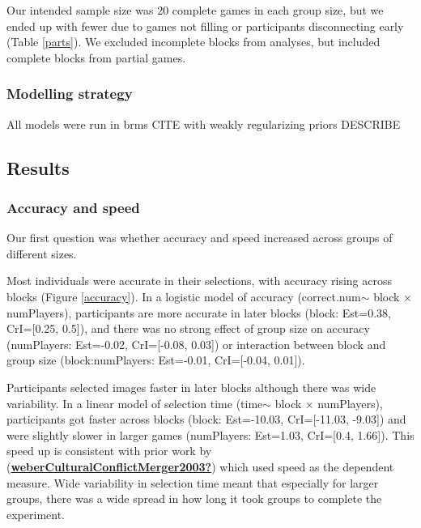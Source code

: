\documentclass[
  english,
  a4paper,
]{article}
\begin{document}
Our intended sample size was 20 complete games in each group size, but we ended up with fewer due to games not filling or participants disconnecting early (Table \ref{parts}). We excluded incomplete blocks from analyses, but included complete blocks from partial games.

\hypertarget{modelling-strategy}{%
\subsubsection{Modelling strategy}\label{modelling-strategy}}

All models were run in brms CITE with weakly regularizing priors DESCRIBE

\hypertarget{results}{%
\subsection{Results}\label{results}}

\hypertarget{accuracy-and-speed}{%
\subsubsection{Accuracy and speed}\label{accuracy-and-speed}}

Our first question was whether accuracy and speed increased across groups of different sizes.

Most individuals were accurate in their selections, with accuracy rising across blocks (Figure \ref{accuracy}). In a logistic model of accuracy (correct.num\(\sim\) block \(\times\) numPlayers), participants are more accurate in later blocks (block: Est=0.38, CrI={[}0.25, 0.5{]}), and there was no strong effect of group size on accuracy (numPlayers: Est=-0.02, CrI={[}-0.08, 0.03{]}) or interaction between block and group size (block:numPlayers: Est=-0.01, CrI={[}-0.04, 0.01{]}).

Participants selected images faster in later blocks although there was wide variability. In a linear model of selection time (time\(\sim\) block \(\times\) numPlayers), participants got faster across blocks (block: Est=-10.03, CrI={[}-11.03, -9.03{]}) and were slightly slower in larger games (numPlayers: Est=1.03, CrI={[}0.4, 1.66{]}). This speed up is consistent with prior work by (\protect\hyperlink{ref-weberCulturalConflictMerger2003}{\textbf{weberCulturalConflictMerger2003?}}) which used speed as the dependent measure. Wide variability in selection time meant that especially for larger groups, there was a wide spread in how long it took groups to complete the experiment.
\end{document}

